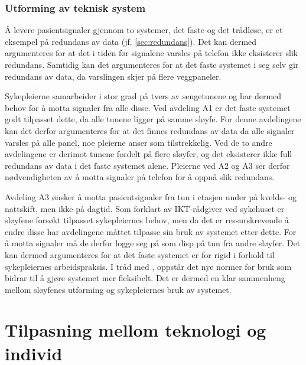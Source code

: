 \subsubsection{Utforming av teknisk system}
Å levere pasientsignaler gjennom to systemer, det faste og det trådløse, er et eksempel på redundans av data (jf. \ref{sec:redundans}). Det kan dermed argumenteres for at det i tiden før signalene varsles på telefon ikke eksisterer slik redundans. Samtidig kan det argumenteres for at det faste systemet i seg selv gir redundans av data, da varslingen skjer på flere veggpaneler. 

\noindent
Sykepleierne samarbeider i stor grad på tvers av sengetunene og har dermed behov for å motta signaler fra alle disse. Ved avdeling A1 er det faste systemet godt tilpasset dette, da alle tunene ligger på samme sløyfe. For denne avdelingene kan det derfor argumenteres for at det finnes redundans av data da alle signaler varsles på alle panel, noe pleierne anser som tilstrekkelig. Ved de to andre avdelingene er derimot tunene fordelt på flere sløyfer, og det eksisterer ikke full redundans av data i det faste systemet alene. Pleierne ved A2 og A3 ser derfor nødvendigheten av å motta signaler på telefon for å oppnå slik redundans. 

\noindent
Avdeling A3 ønsker å motta pasientsignaler fra tun i etasjen under på kvelds- og nattskift, men ikke på dagtid. Som forklart av IKT-rådgiver ved sykehuset er sløyfene forsøkt tilpasset sykepleiernes behov, men da det er ressurskrevende å endre disse har avdelingene måttet tilpasse sin bruk av systemet etter dette. For å motta signaler må de derfor logge seg på som disp på tun fra andre sløyfer. Det kan dermed argumenteres for at det faste systemet er for rigid i forhold til sykepleiernes arbeidspraksis. I tråd med \citep{Ackermann00}, oppstår det nye normer for bruk som bidrar til å gjøre systemet mer fleksibelt. Det er dermed en klar sammenheng mellom sløyfenes utforming og sykepleiernes bruk av systemet.

\section{Tilpasning mellom teknologi og individ}


